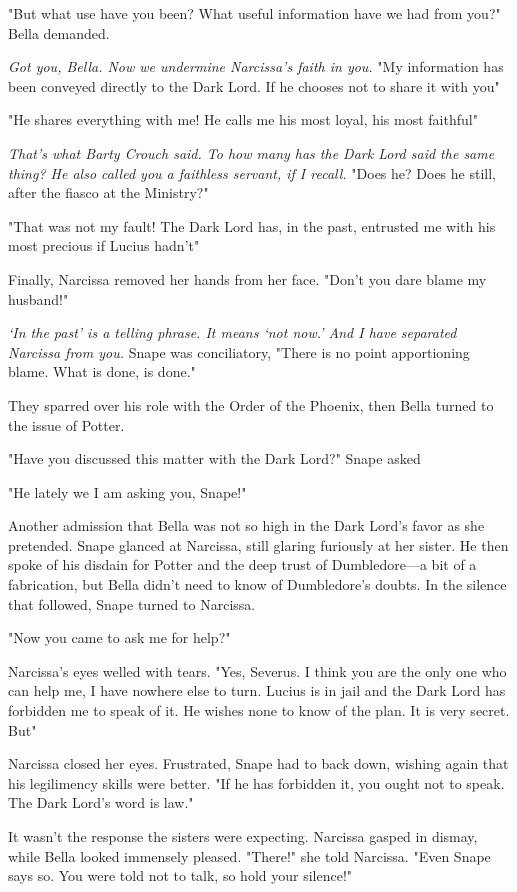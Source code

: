 "But what use have you been? What useful information have we had from you?" Bella demanded.

\emph{Got you, Bella. Now we undermine Narcissa's faith in you.} "My information has been conveyed directly to the Dark Lord. If he chooses not to share it with you{\el}"

"He shares everything with me! He calls me his most loyal, his most faithful{\el}"

\emph{That's what Barty Crouch said. To how many has the Dark Lord said the same thing? He also called you a faithless servant, if I recall.} "Does he? Does he still, after the fiasco at the Ministry?"

"That was not my fault! The Dark Lord has, in the past, entrusted me with his most precious{\el} if Lucius hadn't{\el}"

Finally, Narcissa removed her hands from her face. "Don't you dare blame my husband!"

\emph{`In the past' is a telling phrase. It means `not now.' And I have separated Narcissa from you.} Snape was conciliatory, "There is no point apportioning blame. What is done, is done."

They sparred over his role with the Order of the Phoenix, then Bella turned to the issue of Potter.

"Have you discussed this matter with the Dark Lord?" Snape asked

"He{\el} lately we{\el} I am asking you, Snape!"

Another admission that Bella was not so high in the Dark Lord's favor as she pretended. Snape glanced at Narcissa, still glaring furiously at her sister. He then spoke of his disdain for Potter and the deep trust of Dumbledore—a bit of a fabrication, but Bella didn't need to know of Dumbledore's doubts. In the silence that followed, Snape turned to Narcissa.

"Now{\el} you came to ask me for help?"

Narcissa's eyes welled with tears. "Yes, Severus. I think you are the only one who can help me, I have nowhere else to turn. Lucius is in jail and{\el} the Dark Lord has forbidden me to speak of it. He wishes none to know of the plan. It is very{\el} secret. But{\el}"

Narcissa closed her eyes. Frustrated, Snape had to back down, wishing again that his legilimency skills were better. "If he has forbidden it, you ought not to speak. The Dark Lord's word is law."

It wasn't the response the sisters were expecting. Narcissa gasped in dismay, while Bella looked immensely pleased. "There!" she told Narcissa. "Even Snape says so. You were told not to talk, so hold your silence!"

